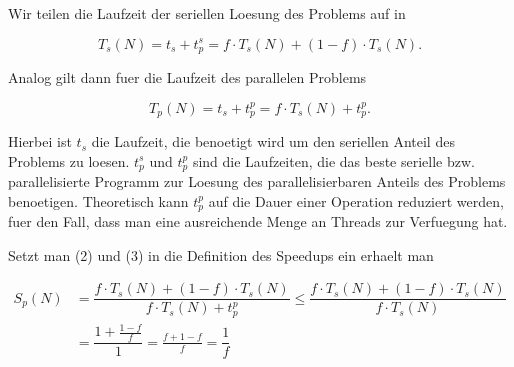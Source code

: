 \documentclass[10pt,a4paper]{article}
\begin{document}
Wir teilen die Laufzeit der seriellen Loesung des Problems auf in

\begin{equation}
	T_s(N) = t_s + t^s_p = f \cdot T_s(N) + (1-f) \cdot T_s(N).
\end{equation}

Analog gilt dann fuer die Laufzeit des parallelen Problems

\begin{equation}
	T_p(N) = t_s + t^p_p = f \cdot T_s(N) + t^p_p.
\end{equation}

Hierbei ist $t_s$ die Laufzeit, die benoetigt wird um den seriellen Anteil des
Problems zu loesen. $t^s_p$ und $t^p_p$ sind die Laufzeiten, die das beste serielle bzw.
parallelisierte Programm zur Loesung des parallelisierbaren Anteils des Problems benoetigen.
Theoretisch kann $t^p_p$ auf die Dauer einer Operation reduziert werden, fuer den Fall,
dass man eine ausreichende Menge an Threads zur Verfuegung hat.

Setzt man (2) und (3) in die Definition des Speedups ein erhaelt man

\begin{align*}
	S_p(N) &= \dfrac{f \cdot T_s(N) + (1-f) \cdot T_s(N)}{f \cdot T_s(N) + t^p_p} \leq \dfrac{f \cdot T_s(N) + (1-f) \cdot T_s(N)}{f \cdot T_s(N)} \\
				 &= \dfrac{1 + \frac{1-f}{f}}{1} = \frac{f+1-f}{f} = \dfrac{1}{f}
\end{align*}
\end{document}
